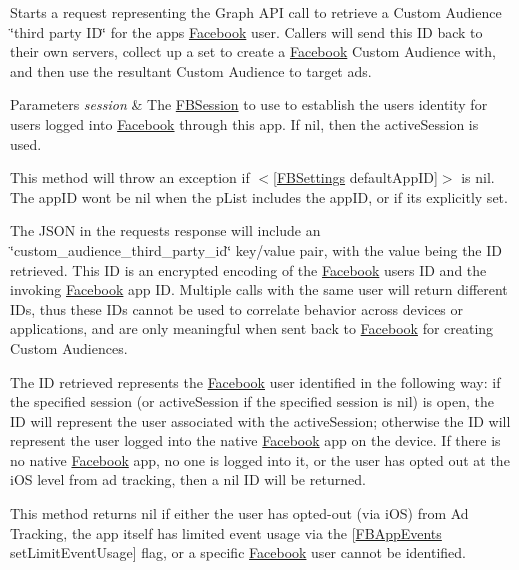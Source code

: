 Starts a request representing the Graph A\+PI call to retrieve a Custom Audience \char`\"{}third party I\+D\char`\"{} for the app\textquotesingle{}s \hyperlink{interfaceFacebook}{Facebook} user. Callers will send this ID back to their own servers, collect up a set to create a \hyperlink{interfaceFacebook}{Facebook} Custom Audience with, and then use the resultant Custom Audience to target ads.


\begin{DoxyParams}{Parameters}
{\em session} & The \hyperlink{interfaceFBSession}{F\+B\+Session} to use to establish the user\textquotesingle{}s identity for users logged into \hyperlink{interfaceFacebook}{Facebook} through this app. If {\ttfamily nil}, then the active\+Session is used.\\
\hline
\end{DoxyParams}
This method will throw an exception if $<$\mbox{[}\hyperlink{interfaceFBSettings}{F\+B\+Settings} default\+App\+ID\mbox{]}$>$ is {\ttfamily nil}. The app\+ID won\textquotesingle{}t be nil when the p\+List includes the app\+ID, or if it\textquotesingle{}s explicitly set.

The J\+S\+ON in the request\textquotesingle{}s response will include an \char`\"{}custom\+\_\+audience\+\_\+third\+\_\+party\+\_\+id\char`\"{} key/value pair, with the value being the ID retrieved. This ID is an encrypted encoding of the \hyperlink{interfaceFacebook}{Facebook} user\textquotesingle{}s ID and the invoking \hyperlink{interfaceFacebook}{Facebook} app ID. Multiple calls with the same user will return different I\+Ds, thus these I\+Ds cannot be used to correlate behavior across devices or applications, and are only meaningful when sent back to \hyperlink{interfaceFacebook}{Facebook} for creating Custom Audiences.

The ID retrieved represents the \hyperlink{interfaceFacebook}{Facebook} user identified in the following way\+: if the specified session (or active\+Session if the specified session is {\ttfamily nil}) is open, the ID will represent the user associated with the active\+Session; otherwise the ID will represent the user logged into the native \hyperlink{interfaceFacebook}{Facebook} app on the device. If there is no native \hyperlink{interfaceFacebook}{Facebook} app, no one is logged into it, or the user has opted out at the i\+OS level from ad tracking, then a {\ttfamily nil} ID will be returned.

This method returns {\ttfamily nil} if either the user has opted-\/out (via i\+OS) from Ad Tracking, the app itself has limited event usage via the {\ttfamily \mbox{[}\hyperlink{interfaceFBAppEvents}{F\+B\+App\+Events} set\+Limit\+Event\+Usage\mbox{]}} flag, or a specific \hyperlink{interfaceFacebook}{Facebook} user cannot be identified.


